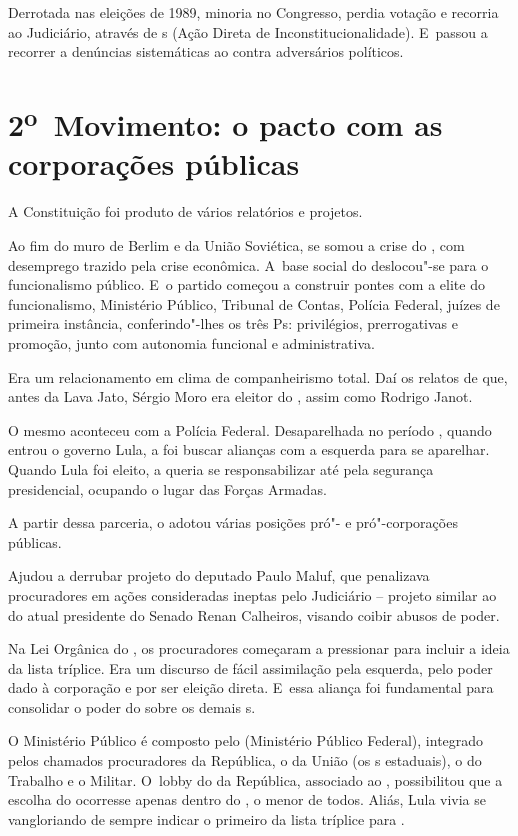 Derrotada nas eleições de 1989, minoria no Congresso, perdia votação e
recorria ao Judiciário, através de s (Ação Direta de
Inconstitucionalidade). E~passou a recorrer a denúncias sistemáticas ao
 contra adversários políticos.

\section{2\textsuperscript{o}~Movimento: o pacto com as corporações
públicas}

A Constituição foi produto de vários relatórios e projetos.

Ao fim do muro de Berlim e da União Soviética, se somou a crise do ,
com desemprego trazido pela crise econômica. A~base social do 
deslocou"-se para o funcionalismo público. E~o partido começou a
construir pontes com a elite do funcionalismo, Ministério Público,
Tribunal de Contas, Polícia Federal, juízes de primeira instância,
conferindo"-lhes os três Ps: privilégios, prerrogativas e promoção, junto
com autonomia funcional e administrativa.

Era um relacionamento em clima de companheirismo total. Daí os relatos
de que, antes da Lava Jato, Sérgio Moro era eleitor do , assim como
Rodrigo Janot.

O mesmo aconteceu com a Polícia Federal. Desaparelhada no período ,
quando entrou o governo Lula, a  foi buscar alianças com a esquerda
para se aparelhar. Quando Lula foi eleito, a  queria se
responsabilizar até pela segurança presidencial, ocupando o lugar das
Forças Armadas.

A partir dessa parceria, o  adotou várias posições pró"- e
pró"-corporações públicas.

Ajudou a derrubar projeto do deputado Paulo Maluf, que penalizava
procuradores em ações consideradas ineptas pelo Judiciário -- projeto
similar ao do atual presidente do Senado Renan Calheiros, visando coibir
abusos de poder.

Na Lei Orgânica do , os procuradores começaram a pressionar para
incluir a ideia da lista tríplice. Era um discurso de fácil assimilação
pela esquerda, pelo poder dado à corporação e por ser eleição direta. E~essa aliança foi fundamental para consolidar o poder do  sobre os
demais s.

O Ministério Público é composto pelo  (Ministério Público Federal),
integrado pelos chamados procuradores da República, o da União (os s
estaduais), o do Trabalho e o Militar. O~lobby do  da República,
associado ao , possibilitou que a escolha do  ocorresse apenas
dentro do , o menor de todos. Aliás, Lula vivia se vangloriando de
sempre indicar o primeiro da lista tríplice para .

